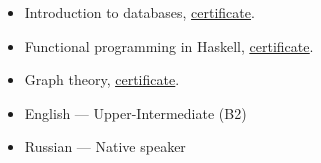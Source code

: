 \documentclass[10pt,a4paper,ragged2e,withhyper]{altacv}
\begin{document}
\begin{paracol}{2}
\begin{itemize}
\item Introduction to databases, \href{https://stepik.org/cert/336064}
{\underline{certificate}}.

\item Functional programming in Haskell,
\href{https://stepik.org/cert/272055}
{\underline{certificate}}.

\item Graph theory,
\href{https://coursera.org/share/713ce9741f5f39a7c4d56af9d5e9b60e}
{\underline{certificate}}.

\end{itemize}

\begin{itemize}
\item English — Upper-Intermediate (B2)
\item Russian — Native speaker
\end{itemize}


\end{paracol}
\end{document}
